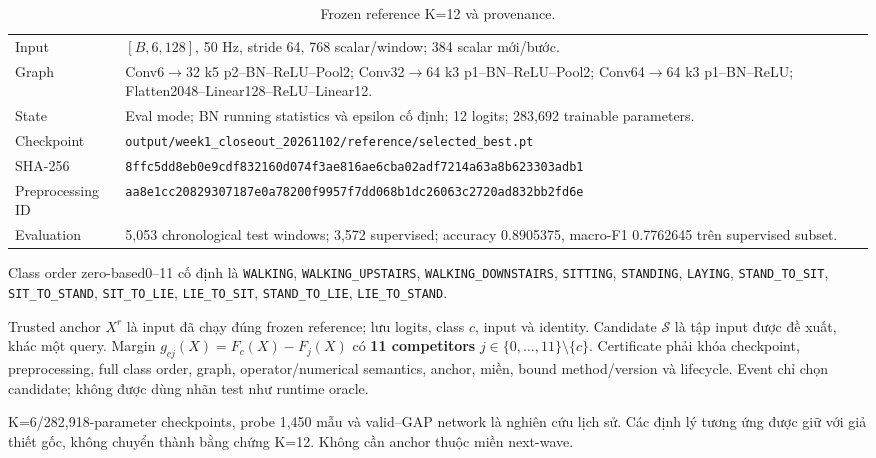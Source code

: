 \documentclass[11pt,a4paper]{article}
\newcommand{\code}[1]{{\small\ttfamily\nolinkurl{#1}}}
\newcommand{\Sset}{\mathcal S}
\theoremstyle{remark}
\begin{document}
\begin{table}[!htbp]\centering\small
\caption{Frozen reference K=12 và provenance.}
\begin{tabularx}{\linewidth}{@{}p{3.0cm}Y@{}}\toprule
Input & $[B,6,128]$, 50 Hz, stride 64, 768 scalar/window; 384 scalar mới/bước.\\
Graph & Conv6$\to$32 k5 p2--BN--ReLU--Pool2;
Conv32$\to$64 k3 p1--BN--ReLU--Pool2;
Conv64$\to$64 k3 p1--BN--ReLU; Flatten2048--Linear128--ReLU--Linear12.\\
State & Eval mode; BN running statistics và epsilon cố định;
12 logits; 283,692 trainable parameters.\\
Checkpoint & \code{output/week1_closeout_20261102/reference/selected_best.pt}\\
SHA-256 & \code{8ffc5dd8eb0e9cdf832160d074f3ae816ae6cba02adf7214a63a8b623303adb1}\\
Preprocessing ID & \code{aa8e1cc20829307187e0a78200f9957f7dd068b1dc26063c2720ad832bb2fd6e}\\
Evaluation & 5,053 chronological test windows; 3,572 supervised;
accuracy 0.8905375, macro-F1 0.7762645 trên supervised subset.\\\bottomrule
\end{tabularx}
\end{table}

Class order zero-based0--11 cố định là
\code{WALKING}, \code{WALKING_UPSTAIRS}, \code{WALKING_DOWNSTAIRS},
\code{SITTING}, \code{STANDING}, \code{LAYING}, \code{STAND_TO_SIT},
\code{SIT_TO_STAND}, \code{SIT_TO_LIE}, \code{LIE_TO_SIT},
\code{STAND_TO_LIE}, \code{LIE_TO_STAND}.

Trusted anchor $X^r$ là input đã chạy đúng frozen reference; lưu logits,
class $c$, input và identity. Candidate $\Sset$ là tập input được đề xuất,
khác một query. Margin $g_{cj}(X)=F_c(X)-F_j(X)$ có
\textbf{11 competitors} $j\in\{0,\ldots,11\}\setminus\{c\}$.
Certificate phải khóa checkpoint, preprocessing, full class order, graph,
operator/numerical semantics, anchor, miền, bound method/version và lifecycle.
Event chỉ chọn candidate; không được dùng nhãn test như runtime oracle.

K=6/282,918-parameter checkpoints, probe 1,450 mẫu và valid--GAP network là
nghiên cứu lịch sử. Các định lý tương ứng được giữ với giả thiết gốc,
không chuyển thành bằng chứng K=12. Không cần anchor thuộc miền next-wave.
\end{document}
